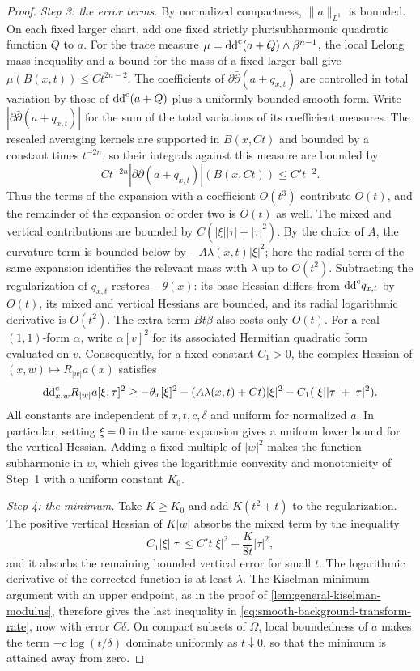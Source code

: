 \begin{proof}
\emph{Step 3: the error terms.} By normalized compactness, $\|a\|_{L^1}$ is bounded. On each fixed larger chart, add one fixed strictly plurisubharmonic quadratic function $Q$ to $a$. For the trace measure $\mu=\mathrm{dd}^{\mathrm{c}}(a+Q)\wedge\beta^{n-1}$, the local Lelong mass inequality and a bound for the mass of a fixed larger ball give $\mu(B(x,t))\leq Ct^{2n-2}$. The coefficients of $\partial\bar\partial(a+q_{x,t})$ are controlled in total variation by those of $\mathrm{dd}^{\mathrm{c}}(a+Q)$ plus a uniformly bounded smooth form. Write $|\partial\bar\partial(a+q_{x,t})|$ for the sum of the total variations of its coefficient measures. The rescaled averaging kernels are supported in $B(x,Ct)$ and bounded by a constant times $t^{-2n}$, so their integrals against this measure are bounded by
\[
 C t^{-2n}|\partial\bar\partial(a+q_{x,t})|(B(x,Ct))
 \leq C't^{-2}.
\]
Thus the terms of the expansion with a coefficient $O(t^3)$ contribute $O(t)$, and the remainder of the expansion of order two is $O(t)$ as well. The mixed and vertical contributions are bounded by $C(|\xi||\tau|+|\tau|^2)$. By the choice of $A$, the curvature term is bounded below by $-A\lambda(x,t)|\xi|^2$; here the radial term of the same expansion identifies the relevant mass with $\lambda$ up to $O(t^2)$. Subtracting the regularization of $q_{x,t}$ restores $-\theta(x)$: its base Hessian differs from $\mathrm{dd}^{\mathrm{c}} q_{x,t}$ by $O(t)$, its mixed and vertical Hessians are bounded, and its radial logarithmic derivative is $O(t^2)$. The extra term $Bt\beta$ also costs only $O(t)$. For a real $(1,1)$-form $\alpha$, write $\alpha[v]^2$ for its associated Hermitian quadratic form evaluated on $v$. Consequently, for a fixed constant $C_1>0$, the complex Hessian of $(x,w)\mapsto R_{|w|}a(x)$ satisfies
\[
 \mathrm{dd}^{\mathrm{c}}_{x,w}R_{|w|}a[\xi,\tau]^2
 \geq-\theta_x[\xi]^2-(A\lambda(x,t)+Ct)|\xi|^2
       -C_1(|\xi||\tau|+|\tau|^2).
\]
All constants are independent of $x,t,c,\delta$ and uniform for normalized $a$. In particular, setting $\xi=0$ in the same expansion gives a uniform lower bound for the vertical Hessian. Adding a fixed multiple of $|w|^2$ makes the function subharmonic in $w$, which gives the logarithmic convexity and monotonicity of Step~1 with a uniform constant $K_0$.

\emph{Step 4: the minimum.} Take $K\geq K_0$ and add $K(t^2+t)$ to the regularization. The positive vertical Hessian of $K|w|$ absorbs the mixed term by the inequality
\[
 C_1|\xi||\tau|\leq C't|\xi|^2+\frac{K}{8t}|\tau|^2,
\]
and it absorbs the remaining bounded vertical error for small $t$. The logarithmic derivative of the corrected function is at least $\lambda$. The Kiselman minimum argument with an upper endpoint, as in the proof of \cref{lem:general-kiselman-modulus}, therefore gives the last inequality in \eqref{eq:smooth-background-transform-rate}, now with error $C\delta$. On compact subsets of $\Omega$, local boundedness of $a$ makes the term $-c\log(t/\delta)$ dominate uniformly as $t\downarrow0$, so that the minimum is attained away from zero.


\end{proof}
